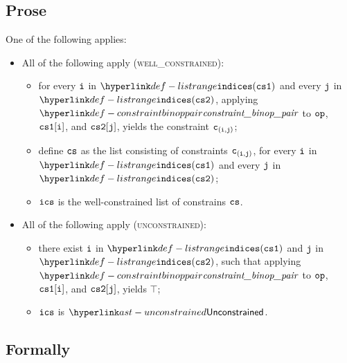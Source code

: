 \subsection{Prose}
One of the following applies:
\begin{itemize}
  \item All of the following apply (\textsc{well\_constrained}):
  \begin{itemize}
    \item for every $\vi$ in $\listrange(\csone)$ and every $\vj$ in $\listrange(\cstwo)$,
          applying \\
          $\constraintbinoppair$ to $\op$, $\csone[\vi]$, and $\cstwo[\vj]$,
          yields the constraint $\vc_{(\vi,\vj)}$;
    \item define $\cs$ as the list consisting of constraints $\vc_{(\vi,\vj)}$,
          for every $\vi$ in $\listrange(\csone)$ and every $\vj$ in $\listrange(\cstwo)$;
    \item $\vics$ is the well-constrained list of constrains $\cs$.
  \end{itemize}

  \item All of the following apply (\textsc{unconstrained}):
  \begin{itemize}
    \item there exist $\vi$ in $\listrange(\csone)$ and $\vj$ in $\listrange(\cstwo)$,
          such that applying
          $\constraintbinoppair$ to $\op$, $\csone[\vi]$, and $\cstwo[\vj]$,
          yields $\top$;
    \item $\vics$ is $\unconstrained$.
  \end{itemize}
\end{itemize}

\subsection{Formally}
\begin{mathpar}
\end{mathpar}

